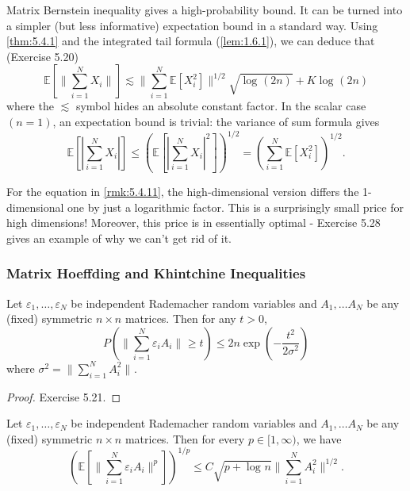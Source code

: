 \begin{remark}
\label{rmk:5.4.11}
Matrix Bernstein inequality gives a high-probability bound. It can be turned into a simpler (but less 
informative) expectation bound in a standard way. Using \cref{thm:5.4.1} and the integrated tail formula 
(\cref{lem:1.6.1}), we can deduce that (Exercise 5.20)
\[ \mathbb{E}\left[ \lVert \sum_{i = 1}^{N} X_i \rVert_{} \right] 
\lesssim \lVert \sum_{i = 1}^{N} \mathbb{E}[X_i^2] \rVert_{}^{1/2} \sqrt{\log_{}{(2n)}} + K \log_{}{(2n)} \]
where the $\lesssim$ symbol hides an absolute constant factor. In the scalar case $(n = 1)$, an expectation 
bound is trivial: the variance of sum formula gives 
\[ \mathbb{E}\left[ \left| \sum_{i = 1}^{N} X_i \right| \right] 
\leq \left( \mathbb{E}\left[ \left| \sum_{i = 1}^{N} X_i \right|^2 \right] \right)^{1/2} 
= \left( \sum_{i = 1}^{N} \mathbb{E}[X_i^2] \right)^{1/2}. \]
\end{remark}

\begin{remark}
For the equation in \cref{rmk:5.4.11}, the high-dimensional version differs the 1-dimensional one by just 
a logarithmic factor. This is a surprisingly small price for high dimensions! Moreover, this price is in 
essentially optimal - Exercise 5.28 gives an example of why we can't get rid of it.
\end{remark}


\subsubsection{Matrix Hoeffding and Khintchine Inequalities}
\begin{theorem}
\label{thm:5.4.13}
Let $\varepsilon_1, \dots, \varepsilon_N$ be independent Rademacher random variables and $A_1, \dots A_N$ be 
any (fixed) symmetric $n \times n$ matrices. Then for any $t > 0$, 
\[ P \left( \lVert \sum_{i = 1}^{N} \varepsilon_i A_i \rVert_{} \geq t \right) 
\leq 2n \exp{\left( -\frac{t^2}{2 \sigma^2} \right)} \]
where $\sigma^2 = \lVert \sum_{i = 1}^{N} A_i^2 \rVert_{}$.
\end{theorem}

\begin{proof}
Exercise 5.21.
\end{proof}

\begin{theorem}
\label{thm:5.4.14}
Let $\varepsilon_1, \dots, \varepsilon_N$ be independent Rademacher random variables and $A_1, \dots A_N$ be 
any (fixed) symmetric $n \times n$ matrices. Then for every $p \in [1, \infty)$, we have 
\[ \left( \mathbb{E}\left[ \lVert \sum_{i = 1}^{N} \varepsilon_i A_i \rVert_{}^p \right] \right)^{1/p} 
\leq C \sqrt{p + \log_{}{n}} \lVert \sum_{i = 1}^{N} A_i^2 \rVert_{}^{1/2}. \]
\end{theorem}

